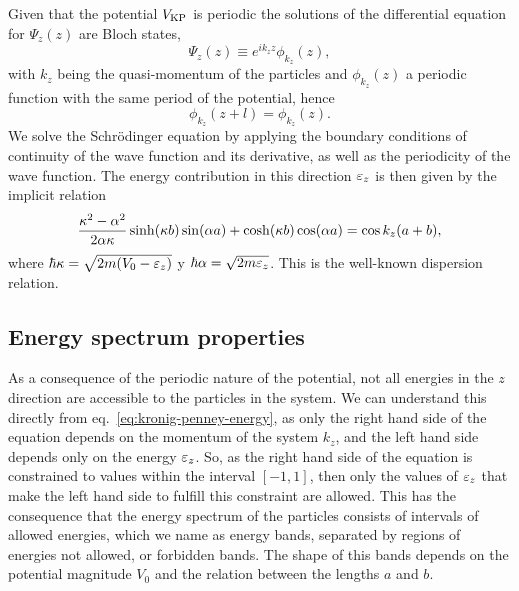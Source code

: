 Given that the {\KP} potential $V_{\mathrm{KP}}$ is periodic the solutions of the
differential equation for $\Psi_z(z)$ are Bloch states,
%
\begin{equation}
	\label{eq:bloch-wave}
	\Psi_z(z) \equiv e^{i k_z z} \phi_{k_z}(z),
\end{equation}
%
with $k_z$ being the quasi-momentum of the particles and $\phi_{k_z}(z)$ a
periodic function with the same period of the potential, hence
%
\begin{equation}
	\phi_{k_z}(z + l) = \phi_{k_z}(z).
\end{equation}
%
We solve the Schrödinger equation by applying the boundary conditions of
continuity of the wave function and its derivative, as well as the periodicity
of the wave function. The energy contribution in this direction ${\varepsilon}_{z}$ is then
given by the implicit relation~\cite{bib:kronig-proc-roy-soc-lond.130.1931}
%
\begin{equation}
	\label{eq:kronig-penney-energy}
	\frac{\kappa^2 - \alpha^2}{2 \alpha \kappa} \sinh(\kappa b) \sin(\alpha a) + \cosh(\kappa b) \cos(\alpha a) = \cos k_{z}(a+b),
\end{equation}
%
where $\hbar\kappa = \sqrt{2m({V_0} - {\varepsilon}_{z})}$ y $\hbar \alpha = \sqrt{2m{\varepsilon}_{z}}$.
This is the well-known {\KP} dispersion relation.


\subsection{Energy spectrum properties}

As a consequence of the periodic nature of the potential, not all energies in
the $z$ direction are accessible to the particles in the system. We can
understand this directly from eq.~\eqref{eq:kronig-penney-energy}, as only the
right hand side of the equation depends on the momentum of the system $k_z$, and
the left hand side depends only on the energy ${\varepsilon}_{z}$. So, as the right hand side
of the equation is constrained to values within the interval $[-1, 1]$, then
only the values of ${\varepsilon}_{z}$ that make the left hand side to fulfill this constraint
are allowed. This has the consequence that the energy spectrum of the particles
consists of intervals of allowed energies, which we name as energy bands,
separated by regions of energies not allowed, or forbidden bands. The shape of
this bands depends on the potential magnitude $V_0$ and the relation between the
lengths $a$ and $b$.

